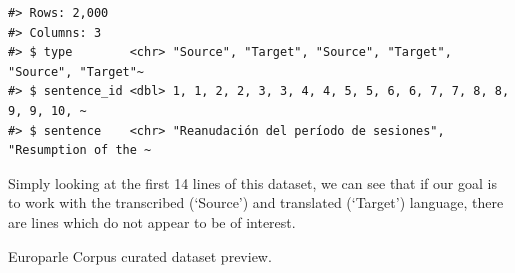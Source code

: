 \documentclass[
  letterpaper,
]{scrbook}
\begin{document}
\begin{verbatim}
#> Rows: 2,000
#> Columns: 3
#> $ type        <chr> "Source", "Target", "Source", "Target", "Source", "Target"~
#> $ sentence_id <dbl> 1, 1, 2, 2, 3, 3, 4, 4, 5, 5, 6, 6, 7, 7, 8, 8, 9, 9, 10, ~
#> $ sentence    <chr> "Reanudación del período de sesiones", "Resumption of the ~
\end{verbatim}

Simply looking at the first 14 lines of this dataset, we can see that if
our goal is to work with the transcribed (`Source') and translated
(`Target') language, there are lines which do not appear to be of
interest.

\hypertarget{tbl-td-europarle-preview-1}{}
\begin{table}
\caption{\label{tbl-td-europarle-preview-1}Europarle Corpus curated dataset preview. }\tabularnewline


\end{table}
\end{document}
